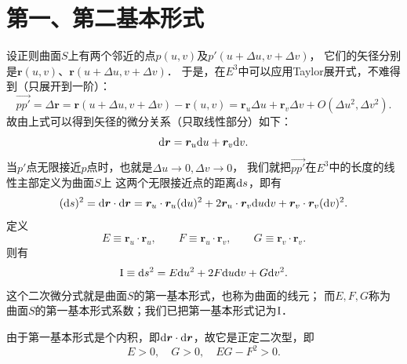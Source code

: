 \section{第一、第二基本形式}
设正则曲面$S$上有两个邻近的点$p(u,v)$及$p'(u+\Delta u, v+\Delta v)$，
它们的矢径分别是$\boldsymbol{r}(u,v)$、$\boldsymbol{r}(u+\Delta u, v+\Delta v)$．
于是，在$E^3$中可以应用Taylor展开式，不难得到（只展开到一阶）：
\begin{equation*}
    \overrightarrow{pp'}=\Delta \boldsymbol{r} =\boldsymbol{r}(u+\Delta u, v+\Delta v) - \boldsymbol{r}(u,v)
    = \boldsymbol{r}_u \Delta u + \boldsymbol{r}_v \Delta v + O(\Delta u^2, \Delta v^2).
\end{equation*}
故由上式可以得到矢径的微分关系（只取线性部分）如下：
\begin{equation}\label{chcdg:eqn_drdudv}
    {\rm d} \boldsymbol{r} = \boldsymbol{r}_u {\rm d} u + \boldsymbol{r}_v {\rm d} v .
\end{equation}
当$p'$点无限接近$p$点时，也就是$\Delta u\to 0, \Delta v\to 0$，
我们就把$\overrightarrow{pp'}$在$E^3$中的长度的线性主部定义为曲面$S$上
这两个无限接近点的距离${\rm d}s$，即有
\begin{equation*}
    ({\rm d}s)^2 = {\rm d}\boldsymbol{r}\cdot {\rm d}\boldsymbol{r}
    = \boldsymbol{r}_u\cdot\boldsymbol{r}_u ({\rm d}u)^2 +2\boldsymbol{r}_u\cdot\boldsymbol{r}_v {\rm d}u {\rm d}v
    + \boldsymbol{r}_v\cdot\boldsymbol{r}_v ({\rm d}v)^2.
\end{equation*}
定义
\begin{equation}
    E\equiv \boldsymbol{r}_u\cdot\boldsymbol{r}_u, \qquad
    F\equiv \boldsymbol{r}_u\cdot\boldsymbol{r}_v, \qquad
    G\equiv \boldsymbol{r}_v\cdot\boldsymbol{r}_v .
\end{equation}
则有
\begin{equation}\label{chcdg:eqn_Iform}
    {\rm I}\equiv {\rm d}s^2 = E {\rm d}u^2 + 2 F {\rm d}u {\rm d}v + G {\rm d}v^2.
\end{equation}
这个二次微分式就是曲面$S$的{\heiti 第一基本形式}，也称为曲面的{\heiti 线元}；
而$E,F,G$称为曲面$S$的{\heiti 第一基本形式系数}；我们已把第一基本形式记为${\rm I}$．

由于第一基本形式是个内积，即${\rm d}\boldsymbol{r}\cdot {\rm d}\boldsymbol{r}$，故它是正定二次型，即
\begin{equation}
    E>0,\quad G>0,\quad  EG -F^2 >0 .
\end{equation}


